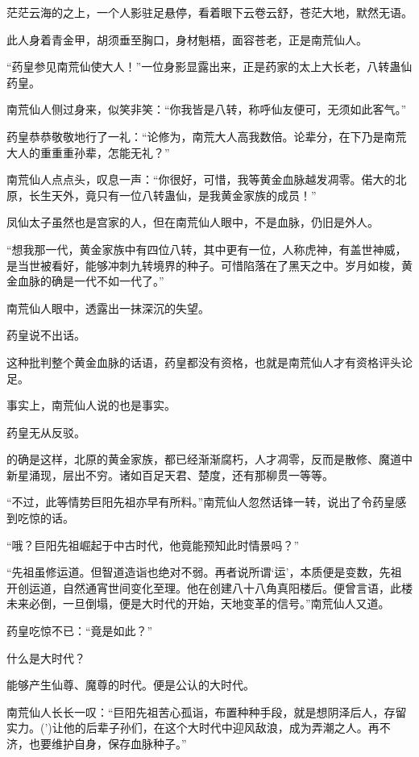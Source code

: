 
\begin{this_body}

茫茫云海的之上，一个人影驻足悬停，看着眼下云卷云舒，苍茫大地，默然无语。

此人身着青金甲，胡须垂至胸口，身材魁梧，面容苍老，正是南荒仙人。

“药皇参见南荒仙使大人！”一位身影显露出来，正是药家的太上大长老，八转蛊仙药皇。

南荒仙人侧过身来，似笑非笑：“你我皆是八转，称呼仙友便可，无须如此客气。”

药皇恭恭敬敬地行了一礼：“论修为，南荒大人高我数倍。论辈分，在下乃是南荒大人的重重重孙辈，怎能无礼？”

南荒仙人点点头，叹息一声：“你很好，可惜，我等黄金血脉越发凋零。偌大的北原，长生天外，竟只有一位八转蛊仙，是我黄金家族的成员！”

凤仙太子虽然也是宫家的人，但在南荒仙人眼中，不是血脉，仍旧是外人。

“想我那一代，黄金家族中有四位八转，其中更有一位，人称虎神，有盖世神威，是当世被看好，能够冲刺九转境界的种子。可惜陷落在了黑天之中。岁月如梭，黄金血脉的确是一代不如一代了。”

南荒仙人眼中，透露出一抹深沉的失望。

药皇说不出话。

这种批判整个黄金血脉的话语，药皇都没有资格，也就是南荒仙人才有资格评头论足。

事实上，南荒仙人说的也是事实。

药皇无从反驳。

的确是这样，北原的黄金家族，都已经渐渐腐朽，人才凋零，反而是散修、魔道中新星涌现，层出不穷。诸如百足天君、楚度，还有那柳贯一等等。

“不过，此等情势巨阳先祖亦早有所料。”南荒仙人忽然话锋一转，说出了令药皇感到吃惊的话。

“哦？巨阳先祖崛起于中古时代，他竟能预知此时情景吗？”

“先祖虽修运道。但智道造诣也绝对不弱。再者说所谓‘运’，本质便是变数，先祖开创运道，自然通宵世间变化至理。他在创建八十八角真阳楼后。便曾言语，此楼未来必倒，一旦倒塌，便是大时代的开始，天地变革的信号。”南荒仙人又道。

药皇吃惊不已：“竟是如此？”

什么是大时代？

能够产生仙尊、魔尊的时代。便是公认的大时代。

南荒仙人长长一叹：“巨阳先祖苦心孤诣，布置种种手段，就是想阴泽后人，存留实力。(’)让他的后辈子孙们，在这个大时代中迎风敌浪，成为弄潮之人。再不济，也要维护自身，保存血脉种子。”


\end{this_body}
